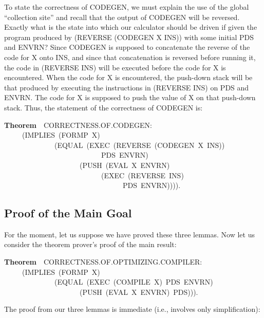 \documentclass[10pt]{book}
\newenvironment{pubasis}{\begin{flushleft}}{\end{flushleft}}
\newcommand{\axiomordefinition}[1]{\vspace{6pt}\Large\textsf{\textbf{#1}}\normalsize}
\begin{document}
To state the correctness of CODEGEN, we must explain the use of the global ``collection site''
and recall that the output of CODEGEN will be reversed.
Exactly what is the state into which our calculator should be driven
if given the program produced by (REVERSE (CODEGEN X INS)) with some initial PDS and
ENVRN?  Since CODEGEN is supposed to concatenate the reverse of the code
for X onto INS, and since that concatenation is reversed before running it,
the code in (REVERSE INS) will be executed before the code
for X is encountered.  When the code for
X is encountered, the push-down stack will be   that produced by executing
the instructions in (REVERSE INS) on PDS and ENVRN.  The code for X is supposed to push the value
of X on that push-down stack.  Thus, the statement of the correctness of
CODEGEN is:
\begin{pubasis}
\axiomordefinition{Theorem}~~CORRECTNESS.OF.CODEGEN:\\
~~~~~(IMPLIES~(FORMP~X)\\
~~~~~~~~~~~~~~(EQUAL~(EXEC~(REVERSE~(CODEGEN~X~INS))\\
~~~~~~~~~~~~~~~~~~~~~~~~~~~PDS~ENVRN)\\
~~~~~~~~~~~~~~~~~~~~~(PUSH~(EVAL~X~ENVRN)\\
~~~~~~~~~~~~~~~~~~~~~~~~~~~(EXEC~(REVERSE~INS)\\
~~~~~~~~~~~~~~~~~~~~~~~~~~~~~~~~~PDS~ENVRN)))).\\
\end{pubasis}
\subsection{Proof of the Main Goal}
For the moment, let us suppose we have proved these three lemmas.
Now let us consider the theorem prover's proof of the main result:
\begin{pubasis}
\axiomordefinition{Theorem}~~CORRECTNESS.OF.OPTIMIZING.COMPILER:\\
~~~~~(IMPLIES~(FORMP~X)\\
~~~~~~~~~~~~~~(EQUAL~(EXEC~(COMPILE~X)~PDS~ENVRN)\\
~~~~~~~~~~~~~~~~~~~~~(PUSH~(EVAL~X~ENVRN)~PDS))).\\
\end{pubasis}
The proof from our three lemmas is immediate (i.e., involves only
simplification):
\end{document}
